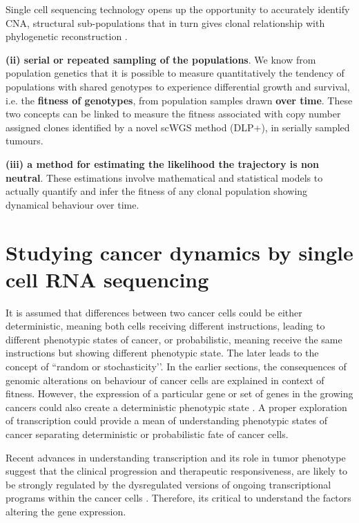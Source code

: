 Single cell sequencing technology opens up the opportunity to accurately identify CNA, structural sub-populations that in turn gives clonal relationship with phylogenetic reconstruction \cite{satas2020scarlet, dorri2020efficient}. 

\textbf{(ii) serial or repeated sampling of the populations}.
We know from population genetics that it is possible to measure quantitatively the tendency of populations with shared genotypes to experience differential growth and survival, i.e. the \textbf{fitness of genotypes}, from population samples drawn \textbf{over time}.
These two concepts can be linked to measure the fitness associated with copy number assigned clones identified by a novel scWGS method (DLP+), in serially sampled tumours.

\textbf{(iii) a method for estimating the likelihood the trajectory is non neutral}.
These estimations involve mathematical and statistical models to actually quantify and infer the fitness of any clonal population showing dynamical behaviour over time.



\section{Studying cancer dynamics by single cell RNA sequencing}

It is assumed that differences between two cancer cells could be either deterministic, meaning both cells receiving different instructions, leading to different phenotypic states of cancer, or probabilistic, meaning receive the same instructions but showing different phenotypic state. The later leads to the concept of ``random or stochasticity’’. In the earlier sections, the consequences of genomic alterations on behaviour of cancer cells are explained in context of fitness. However, the expression of a particular gene or set of genes in the growing cancers could also create a deterministic phenotypic state \cite{symmons2016s}. A proper exploration of transcription could provide a mean of understanding phenotypic states of cancer separating deterministic or probabilistic fate of cancer cells. 

Recent advances in understanding transcription and its role in tumor phenotype suggest that the clinical progression and therapeutic responsiveness, are likely to be strongly regulated by the dysregulated versions of ongoing transcriptional programs within the cancer cells \cite{lawrence2014discovery, sur2016role}. Therefore, its critical to understand the factors altering the gene expression.

